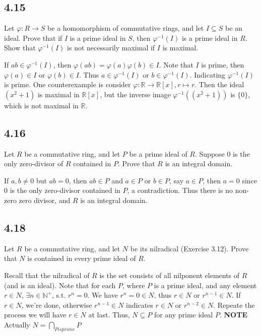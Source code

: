 \documentclass[a4paper, pdf, 12pt]{article}
\makeatletter
\renewenvironment{proof}[1][\proofname]{\par
  \pushQED{\qed}%
  \normalfont \topsep6\p@\@plus6\p@\relax
  \trivlist
  \item[%
    \hskip\labelsep
    \normalfont\bfseries %
    #1%
    \@addpunct{.}%
  ]\ignorespaces
}{%
  \popQED\endtrivlist\@endpefalse
}
\let\qed\relax %
\DeclareRobustCommand{\qed}{%
  \ifmmode \mathqed
  \else
    \leavevmode\unskip\penalty\@M\hbox{}\nobreak\hspace{.5em minus .1em}%
    \hbox{\qedsymbol}%
  \fi
}
\makeatother
\begin{document}
\subsection*{4.15}
Let $\varphi: R \rightarrow S$ be a homomorphism of commutative rings, and let $I \subseteq S$ be an ideal. 
Prove that if $I$ is a prime ideal in $S$, then $\varphi^{-1} (I)$ is a prime ideal in $R$. 
Show that $\varphi^{-1}(I)$ is not necessarily maximal if $I$ is maximal.
\begin{proof}
  If $ab\in \varphi^{-1}(I)$, then $\varphi(ab)=\varphi(a)\varphi(b)\in I$. Note that $I$ is prime, then 
  $\varphi(a)\in I$ or $\varphi(b)\in I$. Thus $a\in \varphi^{-1}(I)$ or $b\in \varphi^{-1}(I)$. Indicating 
  $\varphi^{-1}(I)$ is prime.
  One counterexample is consider $\varphi: \mathbb{R}\rightarrow \mathbb{R}[x], r\mapsto r$. Then the 
  ideal $(x^{2} + 1)$ is maximal in $\mathbb{R}[x]$, but the inverse image $\varphi^{-1}((x^{2} + 1))$
  is $\{0\}$, which is not maximal in $\mathbb{R}$.
\end{proof}

\subsection*{4.16}
Let $R$ be a commutative ring, and let $P$ be a prime ideal of $R$. Suppose 0 is the only zero-divisor of $R$ contained in $P$. 
Prove that $R$ is an integral domain.
\begin{proof}
  If $a,b\neq 0$ but $ab=0$, then $ab\in P$ and $a\in P$ or $b\in P$, say $a\in P$, then $a=0$ since 
  $0$ is the only zero-divisor contained in $P$, a contradiction. Thus there is no non-zero zero divisor, 
  and $R$ is an integral domain.
\end{proof}

\subsection*{4.18}
Let $R$ be a commutative ring, and let $N$ be its nilradical (Exercise 3.12). 
Prove that $N$ is contained in every prime ideal of $R$.
\begin{proof}
  Recall that the nilradical of $R$ is the set consists of all nilponent elements of $R$
  (and is an ideal). Note that for each $P$, where $P$ is a prime ideal, and any element 
  $r\in N$, $\exists n\in \mathbb{N}^{+}$, s.t. $r^{n} = 0$. We have 
  $r^{n}=0\in N $, thus $r\in N$ or $r^{n-1}\in N$. If $r\in N$, we're done, otherwise 
  $r^{n-1}\in N$ indicates $r\in N$ or $r^{n-2}\in N$. Repeate the process we will have $r\in N$
  at last. Thus, $N\subseteq P$ for any prime ideal $P$.
\end{proof}
\noindent
\textbf{NOTE} Actually $N=\bigcap_{P is prime}P$
\end{document}
